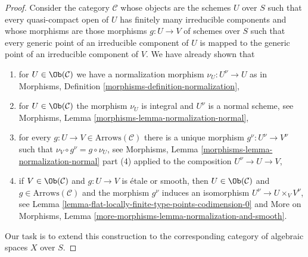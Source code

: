 \begin{proof}
Consider the category $\mathcal{C}$ whose objects are the
schemes $U$ over $S$ such that every quasi-compact open of
$U$ has finitely many irreducible components and whose morphisms
are those morphisms $g : U \to V$ of schemes over $S$ such
that every generic point of an irreducible component of $U$
is mapped to the generic point of an irreducible component of $V$.
We have already shown that
\begin{enumerate}
\item[(a)] for $U \in \Ob(\mathcal{C})$ we have a
normalization morphism $\nu_U : U^\nu \to U$ as in
Morphisms, Definition \ref{morphisms-definition-normalization},
\item[(b)] for $U \in \Ob(\mathcal{C})$ the morphism $\nu_U$
is integral and $U^\nu$ is a normal scheme, see
Morphisms, Lemma \ref{morphisms-lemma-normalization-normal},
\item[(c)] for every $g : U \to V \in \text{Arrows}(\mathcal{C})$
there is a unique morphism $g^\nu : U^\nu \to V^\nu$
such that $\nu_V \circ g^\nu = g \circ \nu_U$, see
Morphisms, Lemma \ref{morphisms-lemma-normalization-normal}
part (4) applied to the composition $U^\nu \to U \to V$,
\item[(d)] if $V \in \Ob(\mathcal{C})$ and $g : U \to V$ is
\'etale or smooth, then $U \in \Ob(\mathcal{C})$ and
$g \in \text{Arrows}(\mathcal{C})$ and the morphism $g^\nu$
induces an isomorphism $U^\nu \to U \times_V V^\nu$, see
Lemma \ref{lemma-flat-locally-finite-type-points-codimension-0}
and More on Morphisms, Lemma
\ref{more-morphisms-lemma-normalization-and-smooth}.
\end{enumerate}
Our task is to extend this construction to the corresponding
category of algebraic spaces $X$ over $S$.


\end{proof}

